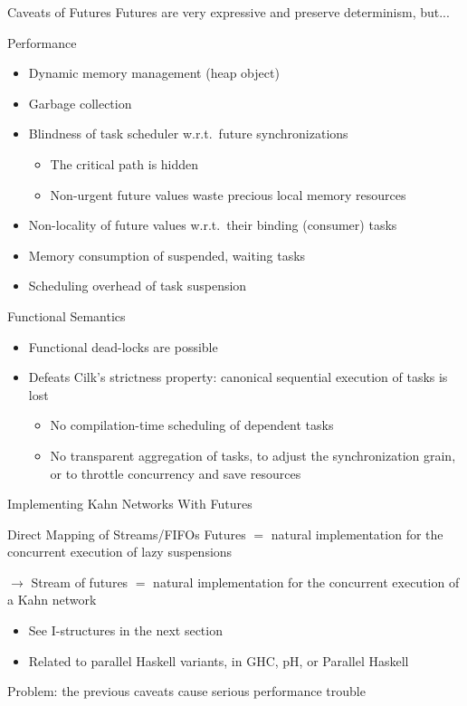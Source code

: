 \documentclass[xcolor=dvipsnames,9pt,mathserif]{beamer}
\begin{document}
\begin{frame}{Caveats of Futures}
  Futures are very expressive and preserve determinism, but...
  
  \begin{block}{Performance}
    \begin{itemize}
    \item Dynamic memory management (heap object)
    \item Garbage collection
    \item Blindness of task scheduler w.r.t.\ future synchronizations
      \begin{itemize}
      \item The critical path is hidden
      \item Non-urgent future values waste precious local memory resources 
      \end{itemize}
    \item Non-locality of future values w.r.t.\ their binding (consumer) tasks
    \item Memory consumption of suspended, waiting tasks
    \item Scheduling overhead of task suspension
    \end{itemize}
  \end{block}
  
  \begin{block}{Functional Semantics}
    \begin{itemize}
    \item Functional dead-locks are possible
    \item Defeats Cilk's strictness property: canonical sequential
      execution of tasks is lost
      \begin{itemize}
      \item No compilation-time scheduling of dependent tasks
      \item No transparent aggregation of tasks, to adjust the
        synchronization grain, or to throttle concurrency and save resources
      \end{itemize}
    \end{itemize}
  \end{block}
\end{frame}

\begin{frame}{Implementing Kahn Networks With Futures}
  \begin{block}{Direct Mapping of Streams/FIFOs}
    Futures $=$ natural implementation for the concurrent execution of
    lazy suspensions

    \bigskip
    $\to$ Stream of futures $=$ natural implementation for the
    concurrent execution of a Kahn network
  \end{block}

  \begin{itemize}
  \item See I-structures in the next section
  \item Related to parallel Haskell variants, in GHC, pH, or Parallel Haskell
  \end{itemize}

  \medskip
  Problem: the previous caveats cause serious performance trouble
\end{frame}
\end{document}
